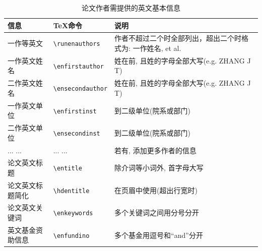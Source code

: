 \documentclass[Chinese]{APSart}
\begin{document}
\begin{enumerate}[leftmargin=7.8mm,itemsep=-0.1ex,label=(\arabic*)]
\begin{table}[H]
\centering{}
\caption{论文作者需提供的英文基本信息\label{tab:enart-metainfor}}
\begin{tabular}{lll}
\toprule
		信息         &  \TeX 命令              & 说明\\
\midrule
		一作等英文   	& \verb/\runenauthors/    & 作者不超过二个时全部列出，超出二个时格式为: 一作姓名, et al.\\
		一作英文姓名     & \verb/\enfirstauthor/   & 姓在前, 且姓的字母全部大写(e.g. ZHANG J T)\\ 
		二作英文姓名     & \verb/\ensecondauthor/  & 姓在前, 且姓的字母全部大写(e.g. ZHANG J T)\\ 
		一作英文单位     & \verb/\enfirstinst/     & 到二级单位(院系或部门)\\ 
		二作英文单位     & \verb/\ensecondinst/    & 到二级单位(院系或部门)\\ 
		... ...     	& ... ...    			& 若有, 添加更多作者的信息\\ 
		论文英文标题     & \verb/\entitle/        & 除介词等小词外, 首字母大写\\
		论文英文标题简化	   & \verb/\hdentitle/ & 在页眉中使用(超出行宽时)\\
		论文英文关键词   & \verb/\enkeywords/     & 多个关键词之间用分号分开\\
		英文基金资助信息  & \verb/\enfundino/        &  多个基金用逗号和“and”分开\\
\bottomrule
\end{tabular}
\end{table}



\end{enumerate}
\end{document}
